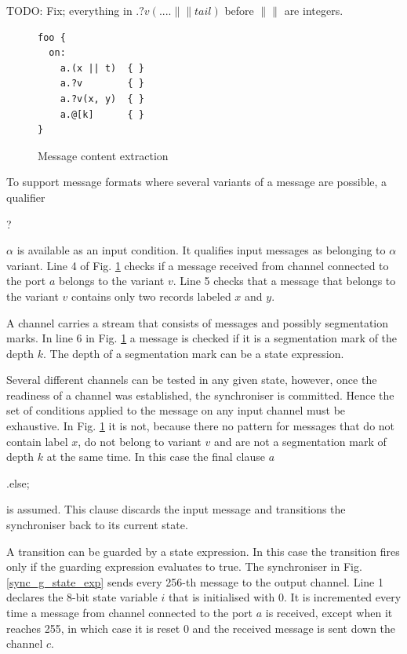 TODO: Fix; everything in $.?v(.... \|\| tail)$ before $\|\|$ are integers.
\begin{figure}[h!]
\lstset{numbers=left, numberstyle=\small, stepnumber=1, numbersep=8pt}
\begin{lstlisting}[frame=single]
foo {
  on:
    a.(x || t)  { }
    a.?v        { }
    a.?v(x, y)  { }
    a.@[k]      { }
}
\end{lstlisting}
\caption{Message content extraction}
\label{sync_trans}
\end{figure}

To support message formats where several variants of a message are possible, a qualifier \begin{bf}?\end{bf}$\alpha$ is available as an input condition. It qualifies input messages as belonging to $\alpha$ variant. Line 4 of Fig. \ref{sync_trans} checks if a message received from channel connected to the port $a$ belongs to the variant $v$. Line 5 checks that a message that belongs to the variant $v$ contains only two records labeled $x$ and $y$. 

A channel carries a stream that consists of messages and possibly segmentation marks. In line 6 in Fig. \ref{sync_trans} a message is checked if it is a segmentation mark of the depth $k$. The depth of a segmentation mark can be a state expression.

Several different channels can be tested in any given state, however, once the readiness of a channel was established, the synchroniser is committed. Hence the set of conditions applied to the message on any input channel must be exhaustive. In Fig. \ref{sync_trans} it is not, because there no pattern for messages that do not contain label $x$, do not belong to variant $v$ and are not a segmentation mark of depth $k$ at the same time. In this case the final clause $a$\begin{bf}.else;\end{bf} is assumed. This clause discards the input message and transitions the synchroniser back to its current state.

A transition can be guarded by a state expression. In this case the transition fires only if the guarding expression evaluates to true. The synchroniser in Fig. \ref{sync_g_state_exp} sends every 256-th message to the output channel. Line 1 declares the 8-bit state variable $i$ that is initialised with 0. It is incremented every time a message from channel connected to the port $a$ is received, except when it reaches 255, in which case it is reset 0 and the received message is sent down the channel $c$. 

